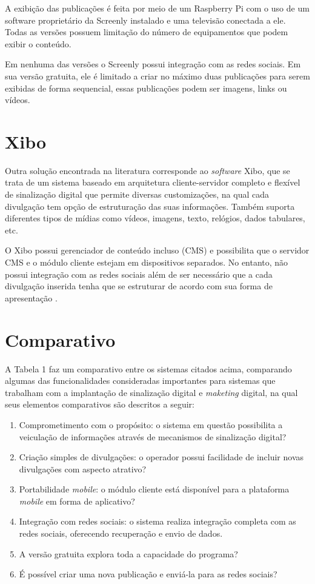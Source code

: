 A exibição das publicações é feita por meio de um Raspberry Pi com o uso de um software proprietário da Screenly instalado e uma televisão conectada a ele. Todas as versões possuem limitação do número de equipamentos que podem exibir o conteúdo.

Em nenhuma das versões o Screenly possui integração com as redes sociais. Em sua versão gratuita, ele é limitado a criar no máximo duas publicações para serem exibidas de forma sequencial, essas publicações podem ser imagens, links ou vídeos.

\section{Xibo}
Outra solução encontrada na literatura corresponde ao \textit{software} Xibo, que se trata de um sistema baseado em arquitetura cliente-servidor completo e flexível de sinalização digital que permite diversas customizações, na qual cada divulgação tem opção de estruturação das suas informações. Também suporta diferentes tipos de mídias como vídeos, imagens, texto, relógios, dados tabulares, etc. 

O Xibo possui gerenciador de conteúdo incluso (CMS) e possibilita que o servidor CMS e o módulo cliente estejam em dispositivos separados. No entanto, não possui integração com as redes sociais além de ser necessário que a cada divulgação inserida tenha que se estruturar de acordo com sua forma de apresentação \cite{xibo2017}.

\section{Comparativo}
A Tabela 1 faz um comparativo entre os sistemas citados acima, comparando algumas das funcionalidades consideradas importantes para sistemas que trabalham com a implantação de sinalização digital e \textit{maketing} digital, na qual seus elementos comparativos são descritos a seguir:
\begin{enumerate}[label=\Roman*)]
	\item Comprometimento com o propósito: o sistema em questão possibilita a veiculação de informações através de mecanismos de sinalização digital?
	\item Criação simples de divulgações: o operador possui facilidade de incluir novas divulgações com aspecto atrativo?
	\item Portabilidade \textit{mobile}: o módulo cliente está disponível para a plataforma \textit{mobile} em forma de aplicativo?
	\item Integração com redes sociais: o sistema realiza integração completa com as redes sociais, oferecendo recuperação e envio de dados.
	\item A versão gratuita explora toda a capacidade do programa?
	\item É possível criar uma nova publicação e enviá-la para as redes sociais?
\end{enumerate}

